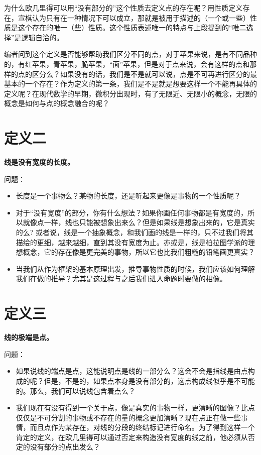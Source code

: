 \documentclass[
]{book}
\providecommand{\tightlist}{%
  \setlength{\itemsep}{0pt}\setlength{\parskip}{0pt}}
\begin{document}
为什么欧几里得可以用``没有部分的''这个性质去定义点的存在呢？用性质定义存在，宣棋认为只有在一种情况下可以成立，那就是被用于描述的（一个或一些）性质是这个存在的唯一（些）性质。这个性质表述唯一的特点与上段提到的``唯二选择''是逻辑自洽的。

编者问到这个定义是否能够帮助我们区分不同的点，对于苹果来说，是有不同品种的，有红苹果，青苹果，脆苹果，``面''苹果，但是对于点来说，会有这样的点和那样的点的区分么？如果没有的话，我们是不是就可以说，点是不可再进行区分的最基本的一个存在？作为定义的第一条，我们是不是就是想要这样一个不能再具体的定义呢？在现代数学的早期，微积分出现时，有了无限近、无限小的概念，无限的概念是如何与点的概念融合的呢？

\hypertarget{ux5b9aux4e49ux4e8c}{%
\section{定义二}\label{ux5b9aux4e49ux4e8c}}

\textbf{线是没有宽度的长度。}

问题：

\begin{itemize}
\tightlist
\item
  长度是一个事物么？某物的长度，还是听起来更像是事物的一个性质呢？
\item
  对于``没有宽度''的部分，你有什么想法？如果你画任何事物都是有宽度的，所以就像点一样，线也只能被想象出来么？但是如果线是想象出来的，它是真实的么? 或者说，线是一个抽象概念，和我们画的线是一样的，只不过我们将其描绘的更细，越来越细，直到其没有宽度为止。亦或是，线是柏拉图学派的理想概念，它的存在像是更完美的事物，所以它也比我们粗糙的铅笔画更真实？
\item
  当我们从作为框架的基本原理出发，推导事物性质的时候，我们应该如何理解我们在做的推导？尤其是这过程与之后我们进入命题时要做的相像。
\end{itemize}

\hypertarget{ux5b9aux4e49ux4e09}{%
\section{定义三}\label{ux5b9aux4e49ux4e09}}

\textbf{线的极端是点。}

问题：

\begin{itemize}
\tightlist
\item
  如果说线的端点是点，这能说明点是线的一部分么？这会不会是指线是由点构成的呢？但是，不是的，如果点本身是没有部分的，这点构成线似乎是不可能的。那么，我们可以说线包含着点么？
\item
  我们现在有没有得到一个关于点，像是真实的事物一样，更清晰的图像？比点仅仅是不可分割的事物或不存在的量的概念更加清晰？现在点正在做一些事情，而且点作为某存在，对线的分段的终结标记进行命名。为了得到这样一个肯定的定义，在欧几里得可以通过否定来构造没有宽度的线之前，他必须从否定的没有部分的点出发么？
\end{itemize}
\end{document}
